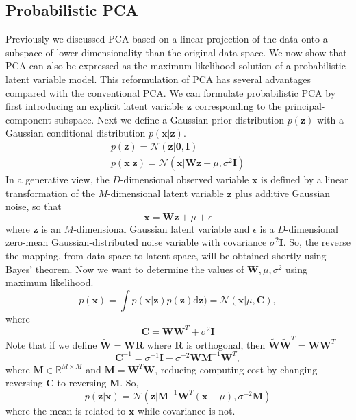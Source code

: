\documentclass[a4paper]{book}
\newcommand{\normD}{\mathcal{N}}
\newcommand{\mrm}{\mathrm}
\newcommand{\mbf}{\mathbf}
\begin{document}
\subsection{Probabilistic PCA}
Previously we discussed PCA based on a linear projection of the data onto a subspace of lower dimensionality than the original data space. We now show that PCA can also be expressed as the maximum likelihood solution of a probabilistic latent variable model. This reformulation of PCA has several advantages compared with the conventional PCA.\newline
We can formulate probabilistic PCA by first introducing an explicit latent variable $\mbf z$ corresponding to the principal-component subspace. Next we define a Gaussian prior distribution $p(\mbf z)$ with a Gaussian conditional distribution $p(\mbf x|\mbf z)$.
\begin{gather}\label{}
  p(\mbf z) = \normD(\mbf z|\mbf{0}, \mbf I) \\
  p(\mbf x|\mbf z) = \normD(\mbf x|\mbf W\mbf z+\mu, \sigma^2\mbf I)
\end{gather}
In a generative view, the $D$-dimensional observed variable $\mbf x$ is defined by a linear transformation of the $M$-dimensional latent variable $\mbf z$ plus additive Gaussian noise, so that
\begin{equation}\label{}
  \mbf x=\mbf W\mbf z+\mu+\epsilon
\end{equation}
where $\mbf z$ is an $M$-dimensional Gaussian latent variable and $\epsilon$ is a $D$-dimensional zero-mean Gaussian-distributed noise variable with covariance $\sigma^2\mbf I$. So, the reverse the mapping, from data space to latent space, will be obtained shortly using Bayes' theorem. Now we want to determine the values of $\mbf W, \mu,\sigma^2$ using maximum likelihood.
\begin{equation}\label{}
  p(\mbf x) = \int p(\mbf x|\mbf z)p(\mbf z)\mrm d\mbf z) = \normD(\mbf x|\mu, \mbf C),
\end{equation}
where
\begin{equation}\label{}
  \mbf C = \mbf W\mbf W^T+\sigma^2\mbf I
\end{equation}
Note that if we define $\tilde{\mbf W} = \mbf {WR}$ where $\mbf R$ is orthogonal, then $\tilde{\mbf W}\tilde{\mbf W}^T=\mbf{WW}^T$
\begin{equation}\label{}
  \mbf C^{-1} = \sigma^{-1}\mbf I-\sigma^{-2}\mbf W\mbf M^{-1}\mbf W^T,
\end{equation}
where $\mbf M\in \mathbb{R}^{M\times M}$ and $\mbf M=\mbf W^T\mbf W$, reducing computing cost by changing reversing $\mbf C$ to reversing $\mbf M$. \newline
So,
\begin{equation}\label{}
  p(\mbf z|\mbf x) = \normD(\mbf z|\mbf M^{-1}\mbf W^T(\mbf x-\mu),\sigma^{-2}\mbf M)
\end{equation}
where the mean is related to $\mbf x$ while covariance is not.
\end{document}
